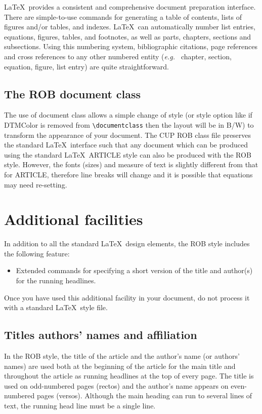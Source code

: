 \documentclass[DTMColor]{ROB-New}
\begin{document}
\LaTeX\ provides a consistent and comprehensive document preparation
interface. There are simple-to-use commands for generating a table of
contents, lists of figures and/or tables, and indexes. \LaTeX\ can
automatically number list entries, equations, figures, tables, and
footnotes, as well as parts, chapters, sections and subsections.
Using this numbering system, bibliographic citations, page references
and cross references to any other numbered entity ({\it e.g.\ } chapter,
section, equation, figure, list entry) are quite straightforward.

\subsection{The ROB document class}

The use of document class allows a simple change of style (or style option like if DTMColor is removed from \verb"\documentclass" then the layout will be in B/W)
to transform the appearance of your document. The CUP ROB class file preserves
the standard \LaTeX\ interface such that any document which can be produced
using the standard \LaTeX\ ARTICLE style can also be produced with the
ROB style. However, the fonts (sizes) and measure of text is slightly different
from that for ARTICLE, therefore line breaks will change and it is possible
that equations may need re-setting.

\section{Additional facilities}

In addition to all the standard \LaTeX\ design elements, the ROB style
includes the following feature:
\begin{itemize}
  \item Extended commands for specifying a short version
        of the title and author(s) for the running
        headlines.
\end{itemize}
Once you have used this additional facility in your document,
do not process it with a standard \LaTeX\ style file.

\subsection{Titles authors' names and affiliation}

In the ROB style, the title of the article and the author's name (or authors'
names) are used both at the beginning of the article for the main title and
throughout the article as running headlines at the top of every page.
The title is used on odd-numbered pages (rectos) and the author's name appears
on even-numbered pages (versos).
Although the main heading can run to several lines of text, the running head
line must be a single line.
\end{document}

